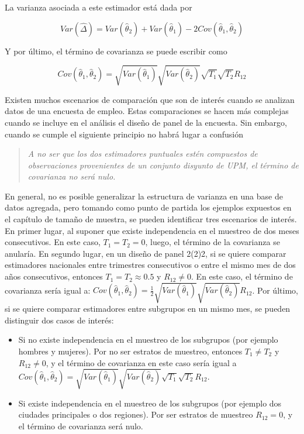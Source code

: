 \documentclass[
  12pt,
  spanish,
]{book}
\begin{document}
La varianza asociada a este estimador está dada por

\[
Var(\hat{\Delta}) 
= Var(\hat{\theta}_2) + Var(\hat{\theta}_1) - 2 Cov(\hat{\theta}_1, \hat{\theta}_2) 
\]

Y por último, el término de covarianza se puede escribir como

\[
Cov(\hat{\theta}_1, \hat{\theta}_2) = \sqrt{Var(\hat{\theta}_1)}\sqrt{Var(\hat{\theta}_2)}\sqrt{T_1}\sqrt{T_2}R_{12}
\]

Existen muchos escenarios de comparación que son de interés cuando se
analizan datos de una encuesta de empleo. Estas comparaciones se hacen
más complejas cuando se incluye en el análisis el diseño de panel de la
encuesta. Sin embargo, cuando se cumple el siguiente principio no habrá
lugar a confusión

\begin{quote}
\emph{A no ser que los dos estimadores puntuales estén compuestos de
observaciones provenientes de un conjunto disyunto de UPM, el término
de covarianza no será nulo.}
\end{quote}

En general, no es posible generalizar la estructura de varianza en una
base de datos agregada, pero tomando como punto de partida los ejemplos
expuestos en el capítulo de tamaño de muestra, se pueden identificar tres escenarios de interés. En primer lugar, al suponer que existe independencia en el muestreo de dos meses consecutivos. En este caso, \(T_1 = T_2 = 0\), luego, el término de la covarianza se anularía. En segundo lugar, en un diseño de panel 2(2)2, si se quiere comparar estimadores nacionales entre trimestres consecutivos o entre el mismo mes de dos años consecutivos, entonces \(T_1 = T_2 \approx 0.5\) y \(R_{12} \neq 0\). En este caso, el término de covarianza sería igual a: \(Cov(\hat{\theta}_1, \hat{\theta}_2) = \frac{1}{2}\sqrt{Var(\hat{\theta}_1)}\sqrt{Var(\hat{\theta}_2)}R_{12}\). Por último, si se quiere comparar estimadores entre subgrupos en un mismo mes, se pueden distinguir dos casos de interés:

\begin{itemize}
\item
  Si no existe independencia en el muestreo de los subgrupos (por ejemplo hombres y mujeres). Por no ser estratos de muestreo, entonces \(T_1 \neq T_2\) y \(R_{12} \neq 0\), y el término de covarianza en este caso sería igual a \(Cov(\hat{\theta}_1, \hat{\theta}_2) = \sqrt{Var(\hat{\theta}_1)}\sqrt{Var(\hat{\theta}_2)}\sqrt{T_1}\sqrt{T_2}R_{12}\).
\item
  Si existe independencia en el muestreo de los subgrupos (por ejemplo dos ciudades principales o dos regiones). Por ser estratos de muestreo \(R_{12} = 0\), y el término de covarianza será nulo.
\end{itemize}
\end{document}
